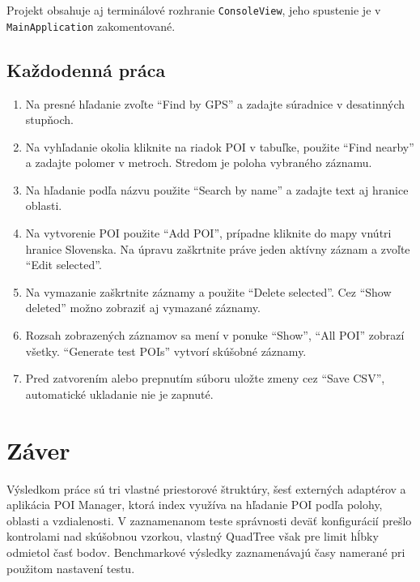 \documentclass[12pt,a4paper,oneside]{report}
\begin{document}
Projekt obsahuje aj terminálové rozhranie \texttt{ConsoleView},
jeho spustenie je v \texttt{MainApplication} zakomentované.

\section{Každodenná práca}
\begin{enumerate}[leftmargin=1.5em]
\item Na presné hľadanie zvoľte \enquote{Find by GPS} a zadajte súradnice v desatinných stupňoch.
\item Na vyhľadanie okolia kliknite na riadok POI v tabuľke, použite \enquote{Find nearby} a zadajte polomer v metroch. Stredom je poloha vybraného záznamu.
\item Na hľadanie podľa názvu použite \enquote{Search by name} a zadajte text aj hranice oblasti.
\item Na vytvorenie POI použite \enquote{Add POI}, prípadne kliknite do mapy vnútri hranice Slovenska. Na úpravu zaškrtnite práve jeden aktívny záznam a zvoľte \enquote{Edit selected}.
\item Na vymazanie zaškrtnite záznamy a použite \enquote{Delete selected}. Cez \enquote{Show deleted} možno zobraziť aj vymazané záznamy.
\item Rozsah zobrazených záznamov sa mení v ponuke \enquote{Show}, \enquote{All POI} zobrazí všetky. \enquote{Generate test POIs} vytvorí skúšobné záznamy.
\item Pred zatvorením alebo prepnutím súboru uložte zmeny cez \enquote{Save CSV}, automatické ukladanie nie je zapnuté.
\end{enumerate}

\chapter{Záver}

Výsledkom práce sú tri vlastné priestorové štruktúry, šesť externých
adaptérov a aplikácia POI Manager, ktorá index využíva na hľadanie POI
podľa polohy, oblasti a vzdialenosti. V zaznamenanom teste správnosti
deväť konfigurácií prešlo kontrolami nad skúšobnou vzorkou, vlastný
QuadTree však pre limit hĺbky odmietol časť bodov. Benchmarkové výsledky
zaznamenávajú časy namerané pri použitom nastavení testu.
\end{document}
